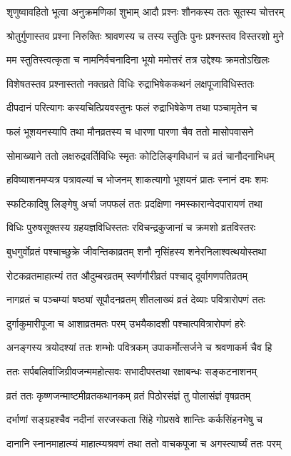 \twolineshloka
{शृणुष्वावहितो भूत्वा अनुक्रमणिकां शुभाम्}
{आदौ प्रश्नः शौनकस्य ततः सूतस्य चोत्तरम्} %

\twolineshloka
{श्रोतुर्गुणास्तव प्रश्ना निरुक्तिः श्रावणस्य च}
{तस्य स्तुतिः पुनः प्रश्नस्तव विस्तरशो मुने} %

\twolineshloka
{मम स्तुतिस्त्वत्कृता च नामनिर्वचनादिना}
{भूयो ममोत्तरं तत्र उद्देश्यः क्रमतोऽखिलः} %

\twolineshloka
{विशेषतस्तव प्रश्नास्ततो नक्तव्रते विधिः}
{रुद्राभिषेककथनं लक्षपूजाविधिस्ततः} %

\twolineshloka
{दीपदानं परित्यागः कस्यचित्प्रियवस्तुनः}
{फलं रुद्राभिषेकेण तथा पञ्चामृतेन च} %

\twolineshloka
{फलं भूशयनस्यापि तथा मौनव्रतस्य च}
{धारणा पारणा चैव ततो मासोपवासने} %

\twolineshloka
{सोमाख्याने ततो लक्षरुद्रवर्तिविधिः स्मृतः}
{कोटिलिङ्गविधानं च व्रतं चानौदनाभिधम्} %

\twolineshloka
{हविष्याशनमप्यत्र पत्रावल्यां च भोजनम्}
{शाकत्यागो भूशयनं प्रातः स्नानं दमः शमः} %

\twolineshloka
{स्फटिकादिषु लिङ्गेषु अर्चा जपफलं ततः}
{प्रदक्षिणा नमस्कारान्वेदपारायणं तथा} %

\twolineshloka
{विधिः पुरुषसूक्तस्य ग्रहयज्ञविधिस्ततः}
{रविचन्द्रकुजानां च क्रमशो व्रतविस्तरः} %

\twolineshloka
{बुधगुर्वोव्रतं पश्चाच्छुक्रे जीवन्तिकाव्रतम्}
{शनौ नृसिंहस्य शनेरनिलाश्वत्थयोस्तथा} %

\twolineshloka
{रोटकव्रतमाहात्म्यं तत औदुम्बरव्रतम्}
{स्वर्णगौरीव्रतं पश्चाद् दूर्वागणपतिव्रतम्} %

\twolineshloka
{नागव्रतं च पञ्चम्यां षष्ठ्यां सूपौदनव्रतम्}
{शीतलाख्यं व्रतं देव्याः पवित्रारोपणं ततः} %

\twolineshloka
{दुर्गाकुमारीपूजा च आशाव्रतमतः परम्}
{उभयैकादशी पश्चात्पवित्रारोपणं हरेः} %

\twolineshloka
{अनङ्गस्य त्रयोदश्यां ततः शम्भोः पवित्रकम्}
{उपाकर्मोत्सर्जने च श्रवणाकर्म चैव हि} %

\twolineshloka
{ततः सर्पबलिर्वाजिग्रीवजन्ममहोत्सवः}
{सभादीपस्तथा रक्षाबन्धः सङ्कटनाशनम्} %

\twolineshloka
{व्रतं ततः कृष्णजन्माष्टमीव्रतकथानकम्}
{व्रतं पिठोरसंज्ञं तु पोलासंज्ञं वृषव्रतम्} %

\twolineshloka
{दर्भाणां सङ्ग्रहश्चैव नदीनां सरजस्कता}
{सिंहे गोप्रसवे शान्तिः कर्कसिंहनभेषु च} %

\twolineshloka
{दानानि स्नानमाहात्म्यं माहात्म्यश्रवणं तथा}
{ततो वाचकपूजा च अगस्त्यार्घ्यं ततः परम्} %

